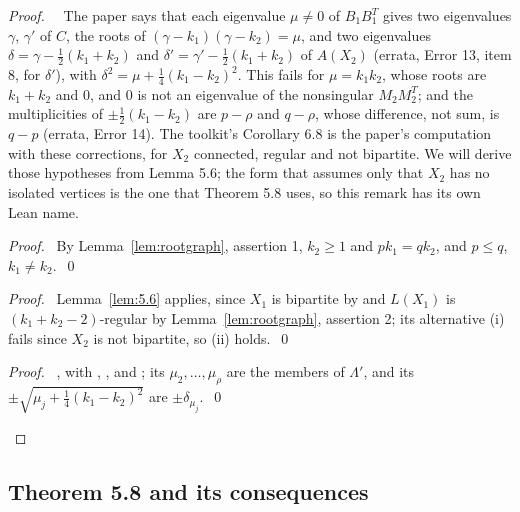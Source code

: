 \begin{proof}
 \pfsketch\ \repair\ The paper says that each eigenvalue $\mu\ne0$ of $B_1B_1^T$ gives two
 eigenvalues $\gamma$, $\gamma'$ of $C$, the roots of $(\gamma-k_1)(\gamma-k_2)=\mu$, and two
 eigenvalues $\delta=\gamma-\frac12(k_1+k_2)$ and $\delta'=\gamma'-\frac12(k_1+k_2)$ of $A(X_2)$
 (errata, Error 13, item 8, for $\delta'$), with $\delta^2=\mu+\frac14(k_1-k_2)^2$. This fails for
 $\mu=k_1k_2$, whose roots are $k_1+k_2$ and $0$, and $0$ is not an eigenvalue of the nonsingular
 $M_2M_2^T$; and the multiplicities of $\pm\frac12(k_1-k_2)$ are $p-\rho$ and $q-\rho$, whose
 difference, not sum, is $q-p$ (errata, Error 14). The toolkit's Corollary 6.8 is the paper's
 computation with these corrections, for $X_2$ connected, regular and not bipartite. We will
 derive those hypotheses from Lemma 5.6; the form that assumes only that $X_2$ has no isolated
 vertices is the one that Theorem 5.8 uses, so this remark has its own Lean name.
 \begin{proof}\pf\ By Lemma~\ref{lem:rootgraph}, assertion 1, $k_2\ge1$ and $pk_1=qk_2$, and
  $p\le q$, $k_1\ne k_2$.~\qed\end{proof}
 \begin{proof}\pf\ Lemma~\ref{lem:5.6} applies, since $X_1$ is bipartite by  and
  $L(X_1)$ is $(k_1+k_2-2)$-regular by Lemma~\ref{lem:rootgraph}, assertion 2; its alternative
  (i) fails since $X_2$ is not bipartite, so (ii) holds.~\qed\end{proof}
 \qedstep
 \begin{proof}\pf\ , with , ,  and
  ; its $\mu_2,\dots,\mu_\rho$ are the members of $\Lambda'$, and its
  $\pm\sqrt{\mu_j+\frac14(k_1-k_2)^2}$ are $\pm\delta_{\mu_j}$.~\qed\end{proof}
\end{proof}

\subsection{Theorem 5.8 and its consequences}

